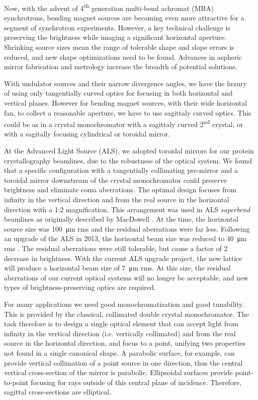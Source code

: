 \documentclass{iucr}       %
\begin{document}
Now, with the advent of 4\textsuperscript{th} generation multi-bend achromat (MBA) synchrotrons, bending magnet sources are becoming even more attractive for a segment of synchrotron experiments. However, a key technical challenge is preserving the brightness while imaging a significant horizontal aperture. Shrinking source sizes mean the range of tolerable shape and slope errors is reduced, and new shape optimizations need to be found. Advances in aspheric mirror fabrication and metrology increase the breadth of potential solutions.

With undulator sources and their narrow divergence angles, we have the luxury of using only tangentially curved optics for focusing in both horizontal and vertical planes. However for bending magnet sources, with their wide horizontal fan, to collect a reasonable aperture, we have to use sagittaly curved optics. This could be as in a crystal monochromator with a sagittaly curved 2\textsuperscript{nd} crystal, or with a sagitally focusing cylindrical or toroidal mirror.

At the Advanced Light Source (ALS), we adopted toroidal mirrors for our protein crystallography beamlines, due to the robustness of the optical system. We found that a specific configuration with a tangentially collimating pre-mirror and a toroidal mirror downstream of the crystal monochromator could preserve brightness and eliminate coma aberrations. The optimal design focuses from infinity in the vertical direction and from the real source in the horizontal direction with a 1:2 magnification. This arrangement was used in ALS \emph{superbend} beamlines as originally described by MacDowell \cite{MacDowell2004}. At the time, the horizontal source size was \SI{100}{\micro\meter} rms and the residual aberrations were far less. Following an upgrade of the ALS in 2013, the horizontal beam size was reduced to \SI{40}{\micro\meter} rms \cite{Steier_2014}. The residual aberrations were still tolerable, but cause a factor of 2 decrease in brightness. With the current ALS upgrade project, the new lattice will produce a horizontal beam size of \SI{7}{\micro\meter} rms. At this size, the residual aberrations of our current optical systems will no longer be acceptable, and new types of brightness-preserving optics are required.

For many applications we need good monochromatization and good tunability. This is provided by the classical, collimated double crystal monochromator. The task therefore is to design a single optical element that can accept light from infinity in the vertical direction (i.e. vertically collimated) and from the real source in the horizontal direction, and focus to a point, unifying two properties not found in a single canonical shape. A parabolic surface, for example, can provide vertical collimation of a point source in one direction, thus the central vertical cross-section of the mirror is parabolic. Ellipsoidal surfaces provide point-to-point focusing for rays outside of this central plane of incidence. Therefore, sagittal cross-sections are elliptical. 
\end{document}
